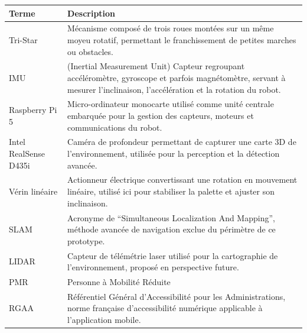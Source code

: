 \documentclass[12pt,a4paper]{article}
\begin{document}
\begin{table}[H]
\centering
\renewcommand{\arraystretch}{1.4}
\begin{tabular}{|p{4cm}|p{11cm}|}
\hline
\textbf{Terme} & \textbf{Description} \\ \hline

Tri-Star & Mécanisme composé de trois roues montées sur un même moyeu rotatif, permettant le franchissement de petites marches ou obstacles. \\ \hline

IMU &  (Inertial Measurement Unit) Capteur regroupant accéléromètre, gyroscope et parfois magnétomètre, servant à mesurer l’inclinaison, l’accélération et la rotation du robot. \\ \hline

Raspberry Pi 5 & Micro-ordinateur monocarte utilisé comme unité centrale embarquée pour la gestion des capteurs, moteurs et communications du robot. \\ \hline

Intel RealSense D435i & Caméra de profondeur permettant de capturer une carte 3D de l’environnement, utilisée pour la perception et la détection avancée. \\ \hline

Vérin linéaire & Actionneur électrique convertissant une rotation en mouvement linéaire, utilisé ici pour stabiliser la palette et ajuster son inclinaison. \\ \hline

SLAM & Acronyme de “Simultaneous Localization And Mapping”, méthode avancée de navigation exclue du périmètre de ce prototype. \\ \hline

LIDAR & Capteur de télémétrie laser utilisé pour la cartographie de l’environnement, proposé en perspective future. \\ \hline

PMR  & Personne à Mobilité Réduite \\ \hline

RGAA & Référentiel Général d’Accessibilité pour les Administrations, norme française d’accessibilité numérique applicable à l’application mobile. \\ \hline

\end{tabular}
\end{table}
\newpage
\end{document}
